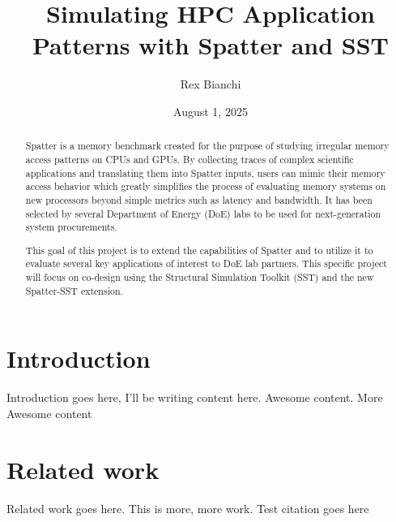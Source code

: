 \documentclass[11pt]{article}
\title{Simulating HPC Application Patterns with Spatter and SST}
\author{Rex Bianchi}
\date{August 1, 2025}
\begin{document}
\maketitle

\begin{abstract}
Spatter is a memory benchmark created for the purpose of studying irregular memory access patterns on CPUs and GPUs. By collecting traces of complex scientific applications and translating them into Spatter inputs, users can mimic their memory access behavior which greatly simplifies the process of evaluating memory systems on new processors beyond simple metrics such as latency and bandwidth. It has been selected by several Department of Energy (DoE) labs to be used for next-generation system procurements.

This goal of this project is to extend the capabilities of Spatter and to utilize it to evaluate several key applications of interest to DoE lab partners. This specific project will focus on co-design using the Structural Simulation Toolkit (SST) and the new Spatter-SST extension. 
\end{abstract}

\section{Introduction}

Introduction goes here, I'll be writing content here. Awesome content. More Awesome content

\section{Related work}

Related work goes here. This is more, more work. Test citation goes here \cite{sheridan:2024:workflow_memsys}


\end{document}
